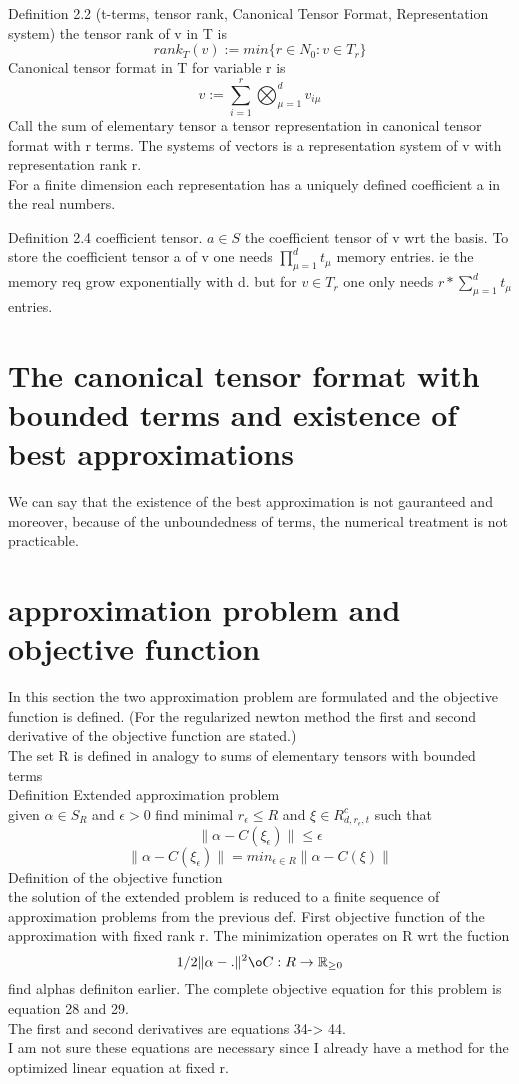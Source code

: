 \documentclass[10pt, draft]{article}
\begin{document}
  Definition 2.2 (t-terms, tensor rank, Canonical Tensor Format, Representation system) 
  the tensor rank of v in T is 
  \[rank_T(v) := min\{ r \in N_0 : v \in T_r\} \]
  Canonical tensor format in T for variable r is 
  \[v := \sum_{i=1}^{r} \bigotimes_{\mu=1}^d v_{i\mu}\]
  Call the sum of elementary tensor a tensor representation in canonical tensor format with r terms.  The systems of vectors is a representation system of v with representation rank r.\\
  For a finite dimension each representation has a uniquely defined coefficient a in the real numbers.\linebreak[1]
  
  Definition 2.4 coefficient tensor.  $ a\in S$ the coefficient tensor of v wrt the basis.  To store the coefficient tensor a of v one needs $\prod_{\mu=1}^d t_\mu$ memory entries.  ie the memory req grow exponentially with d.  but for $v \in T_r$ one only needs $r * \sum_{\mu=1}^d t_\mu$ entries.  
  
   \section{The canonical tensor format with bounded terms and existence of best approximations}
   We can say that the existence of the best approximation is not gauranteed and moreover, because of the unboundedness of terms, the numerical treatment is not practicable.  
   
   \section{approximation problem and objective function}
   In this section the two approximation problem are formulated and the objective function is defined.  (For the regularized newton method the first and second derivative of the objective function are stated.) \\
   The set R is defined in analogy to sums of elementary tensors with bounded terms\\
   Definition Extended approximation problem\\
   given $\alpha \in S_R$ and $\epsilon > 0$ find minimal $r_\epsilon \leq R$ and $\xi \in R^c_{d,r_\epsilon, t}$ such that
   \[ \| \alpha - C(\xi_\epsilon) \| \leq \epsilon\]
   \[\|\alpha - C(\xi_\epsilon) \| = min_{\epsilon \in R} \|\alpha - C(\xi)\|\]
   Definition of the objective function \\
   the solution of the extended problem is reduced to a finite sequence of approximation problems from the previous def. First objective function of the approximation with fixed rank r. The minimization operates on R wrt the fuction 
   \[1/2 \|\alpha - .\|^2 \o C : R \rightarrow \mathbb{R}_{\geq 0}\]
   find alphas definiton earlier. The complete objective equation for this problem is equation 28 and 29. \\
   The first and second derivatives are equations 34-> 44.\\
   I am not sure these equations are necessary since I already have a method for the optimized linear equation at fixed r.
   
\end{document}
